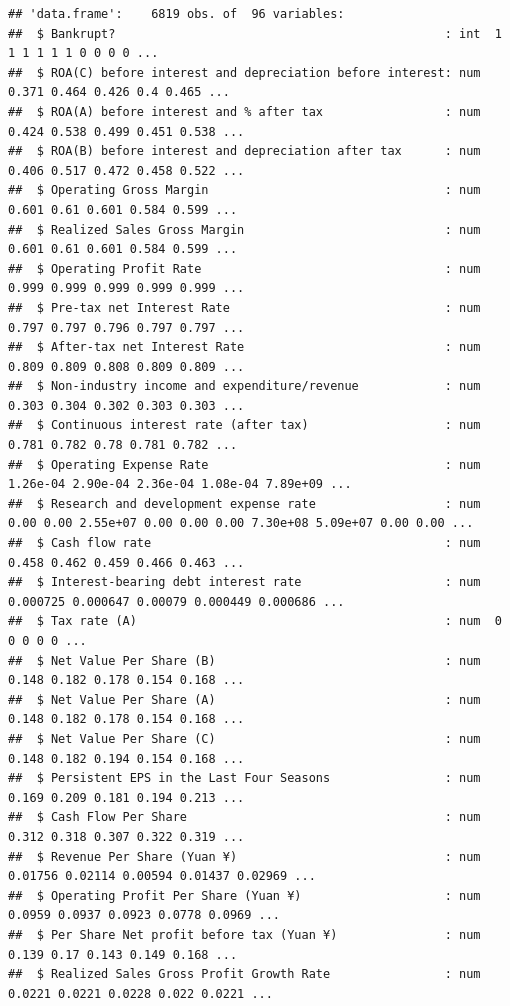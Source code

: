 \documentclass[
]{book}
\begin{document}
\begin{verbatim}
## 'data.frame':    6819 obs. of  96 variables:
##  $ Bankrupt?                                              : int  1 1 1 1 1 1 0 0 0 0 ...
##  $ ROA(C) before interest and depreciation before interest: num  0.371 0.464 0.426 0.4 0.465 ...
##  $ ROA(A) before interest and % after tax                 : num  0.424 0.538 0.499 0.451 0.538 ...
##  $ ROA(B) before interest and depreciation after tax      : num  0.406 0.517 0.472 0.458 0.522 ...
##  $ Operating Gross Margin                                 : num  0.601 0.61 0.601 0.584 0.599 ...
##  $ Realized Sales Gross Margin                            : num  0.601 0.61 0.601 0.584 0.599 ...
##  $ Operating Profit Rate                                  : num  0.999 0.999 0.999 0.999 0.999 ...
##  $ Pre-tax net Interest Rate                              : num  0.797 0.797 0.796 0.797 0.797 ...
##  $ After-tax net Interest Rate                            : num  0.809 0.809 0.808 0.809 0.809 ...
##  $ Non-industry income and expenditure/revenue            : num  0.303 0.304 0.302 0.303 0.303 ...
##  $ Continuous interest rate (after tax)                   : num  0.781 0.782 0.78 0.781 0.782 ...
##  $ Operating Expense Rate                                 : num  1.26e-04 2.90e-04 2.36e-04 1.08e-04 7.89e+09 ...
##  $ Research and development expense rate                  : num  0.00 0.00 2.55e+07 0.00 0.00 0.00 7.30e+08 5.09e+07 0.00 0.00 ...
##  $ Cash flow rate                                         : num  0.458 0.462 0.459 0.466 0.463 ...
##  $ Interest-bearing debt interest rate                    : num  0.000725 0.000647 0.00079 0.000449 0.000686 ...
##  $ Tax rate (A)                                           : num  0 0 0 0 0 ...
##  $ Net Value Per Share (B)                                : num  0.148 0.182 0.178 0.154 0.168 ...
##  $ Net Value Per Share (A)                                : num  0.148 0.182 0.178 0.154 0.168 ...
##  $ Net Value Per Share (C)                                : num  0.148 0.182 0.194 0.154 0.168 ...
##  $ Persistent EPS in the Last Four Seasons                : num  0.169 0.209 0.181 0.194 0.213 ...
##  $ Cash Flow Per Share                                    : num  0.312 0.318 0.307 0.322 0.319 ...
##  $ Revenue Per Share (Yuan ¥)                             : num  0.01756 0.02114 0.00594 0.01437 0.02969 ...
##  $ Operating Profit Per Share (Yuan ¥)                    : num  0.0959 0.0937 0.0923 0.0778 0.0969 ...
##  $ Per Share Net profit before tax (Yuan ¥)               : num  0.139 0.17 0.143 0.149 0.168 ...
##  $ Realized Sales Gross Profit Growth Rate                : num  0.0221 0.0221 0.0228 0.022 0.0221 ...

\end{verbatim}
\end{document}
